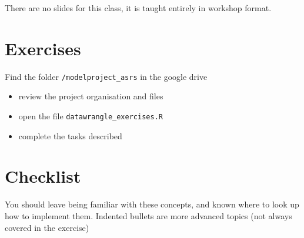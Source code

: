 \documentclass[
]{book}
\providecommand{\tightlist}{%
  \setlength{\itemsep}{0pt}\setlength{\parskip}{0pt}}
\begin{document}
There are no slides for this class, it is taught entirely in workshop format.

\hypertarget{exercises-2}{%
\section{Exercises}\label{exercises-2}}

Find the folder \texttt{/modelproject\_asrs} in the google drive

\begin{itemize}
\tightlist
\item
  review the project organisation and files
\item
  open the file \texttt{datawrangle\_exercises.R}
\item
  complete the tasks described
\end{itemize}

\hypertarget{checklist-3}{%
\section{Checklist}\label{checklist-3}}

You should leave being familiar with these concepts, and known where to look up how to implement them. Indented bullets are more advanced topics (not always covered in the exercise)
\end{document}
